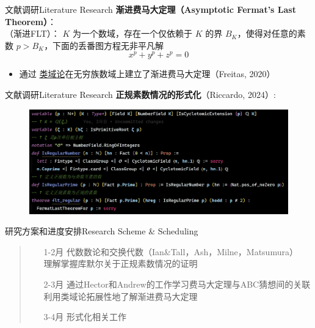 \documentclass[aspectratio=169]{beamer}
\begin{document}
    \begin{frame}{文献调研}{Literature Research}
    \textbf{渐进费马大定理（Asymptotic Fermat's Last Theorem）}：\\
    \vspace{10pt}
    （渐进FLT）： $K$ 为一个数域，存在一个仅依赖于 $K$ 的界 $B_K$，使得对任意的素数 $p > B_K$，下面的丢番图方程无非平凡解
    $$x^p + y^p + z^p = 0$$
    \begin{itemize}
    \item 通过 \underline{类域论}在无穷族数域上建立了渐进费马大定理（Freitas, 2020）
    \end{itemize}
    \end{frame}
    
    \begin{frame}[fragile]{文献调研}{Literature Research}
    \textbf{正规素数情况的形式化}（Riccardo, 2024）:\\
    \begin{figure}
 		\centering
 		\includegraphics[width=0.8\linewidth]{screenshot.png}
	\end{figure}
    \end{frame}
	
	\begin{frame}{研究方案和进度安排}{Research Scheme \& Scheduling}
    \begin{quote}
            \begin{itemize}
                \item[1-2月] 
                代数数论和交换代数（Ian\&Tall，Ash，Milne，Matsumura）\\
                \vspace{3pt}
                理解掌握库默尔关于正规素数情况的证明
                \vspace{10pt}
                \item[2-3月]
                通过Hector和Andrew的工作学习费马大定理与ABC猜想间的关联\\
                \vspace{3pt}
                利用类域论拓展性地了解渐进费马大定理
                \vspace{10pt}
                \item[3-4月] 形式化相关工作
            \end{itemize}
    \end{quote}
    \end{frame}
\end{document}
